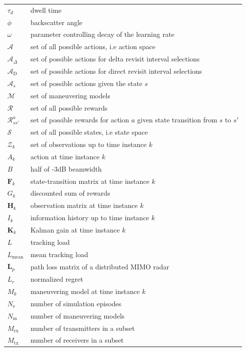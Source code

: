 \documentclass[english, 12pt, a4paper, elec, utf8, a-1b, online]{aaltothesis}
\numberwithin{equation}{section}
\newcommand{\Ne}{N_\text{e}}
\renewcommand{\vec}[1]{\mathbf{#1}}
\newcommand{\Ss}{\mathcal{S}}
\newcommand{\As}{\mathcal{A}}
\newcommand{\Rs}{\mathcal{R}}
\newcommand{\stmodel}{\vec{F}_k}
\newcommand{\omodel}{\vec{H}_k}
\newcommand{\gain}{\vec{K}_k}
\newcommand{\Asdir}{\As_\text{D}}
\newcommand{\Asdelta}{\As_\Delta}
\newcommand{\mimm}{\mathcal{M}}
\newcommand{\nmodels}{{N_\text{m}}}
\newcommand{\regret}{L_r}
\newcommand{\vpl}{\vec{L}_p}
\begin{document}
\begin{longtable}[l]{ll}
$\tau_d$ & dwell time \\
$\phi$ & backscatter angle \\
$\omega$ & parameter controlling decay of the learning rate \\
$\As$ & set of all possible actions, i.e action space \\
$\Asdelta$ & set of possible actions for delta revisit interval selections \\
$\Asdir$ & set of possible actions for direct revisit interval selections \\
$\As_s$ & set of possible actions given the state $s$ \\
$\mimm$ & set of maneuvering models \\
$\Rs$ & set of all possible rewards \\
$\Rs_{ss'}^a$ & set of possible rewards for action $a$ given state transition from $s$ to $s'$ \\
$\Ss$ & set of all possible states, i.e state space \\
$\mathcal{Z}_k$ & set of observations up to time instance $k$ \\
$A_k$ & action at time instance $k$ \\
$B$ & half of -3dB beamwidth \\
$\stmodel$ & state-transition matrix at time instance $k$\\
$G_k$ & discounted sum of rewards \\
$\omodel$ & observation matrix at time instance $k$\\
$I_k$ & information history up to time instance $k$ \\
$\gain$ & Kalman gain at time instance $k$ \\
$L$ & tracking load \\
$L_\text{mean}$ & mean tracking load \\
$\vpl$ & path loss matrix of a distributed MIMO radar\\
$\regret$ & normalized regret \\
$M_k$ & maneuvering model at time instance $k$ \\
$\Ne$ & number of simulation episodes \\
$\nmodels$ & number of maneuvering models \\
$M_\text{rx}$ & number of transmitters in a subset \\
$M_\text{tx}$ & number of receivers in a subset \\

\end{longtable}
\end{document}
